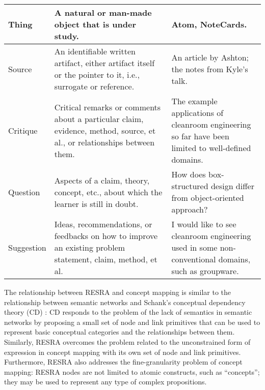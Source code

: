 \begin{table}
\begin{center}
\begin{tabular} {||l|p{2.25in}|p{2.25in}||}
      Thing & A natural or man-made object that is under study.  &
      Atom, NoteCards.  \\ \hline
      
      Source & An identifiable written artifact, either artifact
      itself or the pointer to it, i.e., surrogate or reference. & An
      article by Ashton; the notes from Kyle's talk. \\ \hline \hline
      
      Critique & Critical remarks or comments about a particular
      claim, evidence, method, source, et al., or relationships
      between them. & The example applications of cleanroom
      engineering so far have been limited to well-defined domains.
      \\ \hline
      
      Question & Aspects of a claim, theory, concept, etc., about
      which the learner is still in doubt. & How does box-structured
      design differ from object-oriented approach? \\ \hline
      
      Suggestion & Ideas, recommendations, or feedbacks on how to
      improve an existing problem statement, claim, method, et al.  &
      I would like to see cleanroom engineering used in some
      non-conventional domains, such as groupware. \\ \hline
    \end{tabular}    
  \end{center}
    \label{tab:resra}
\end{table}
\normalsize
{}


The relationship between RESRA and concept mapping is similar to the
relationship between semantic networks and Schank's conceptual dependency
theory (CD) \cite{schank75}: CD responds to the problem of the lack of
semantics in semantic networks by proposing a small set of node and link
primitives that can be used to represent basic conceptual categories and
the relationships between them.  Similarly, RESRA overcomes the problem
related to the unconstrained form of expression in concept mapping with its
own set of node and link primitives. Furthermore, RESRA also addresses the
fine-granularity problem of concept mapping: RESRA nodes are not limited to
atomic constructs, such as ``concepts''; they may be used to represent any
type of complex propositions.

